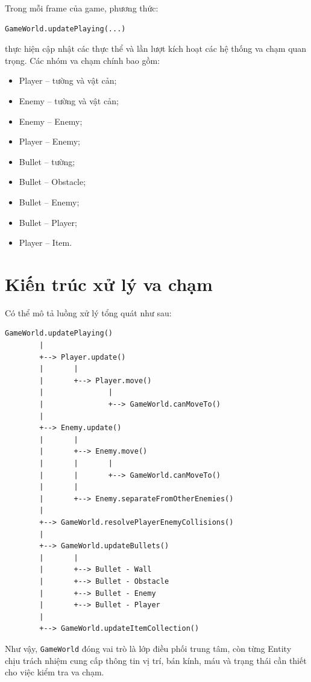 \documentclass[12pt,a4paper]{report}
\begin{document}
    Trong mỗi frame của game, phương thức:
    \begin{verbatim}
GameWorld.updatePlaying(...)
    \end{verbatim}
    thực hiện cập nhật các thực thể và lần lượt kích hoạt các hệ thống
    va chạm quan trọng.
    Các nhóm va chạm chính bao gồm:
    \begin{itemize}
        \item Player -- tường và vật cản;
        \item Enemy -- tường và vật cản;
        \item Enemy -- Enemy;
        \item Player -- Enemy;
        \item Bullet -- tường;
        \item Bullet -- Obstacle;
        \item Bullet -- Enemy;
        \item Bullet -- Player;
        \item Player -- Item.
    \end{itemize}


    \section{Kiến trúc xử lý va chạm}

    Có thể mô tả luồng xử lý tổng quát như sau:

    \begin{verbatim}
GameWorld.updatePlaying()
        |
        +--> Player.update()
        |       |
        |       +--> Player.move()
        |               |
        |               +--> GameWorld.canMoveTo()
        |
        +--> Enemy.update()
        |       |
        |       +--> Enemy.move()
        |       |       |
        |       |       +--> GameWorld.canMoveTo()
        |       |
        |       +--> Enemy.separateFromOtherEnemies()
        |
        +--> GameWorld.resolvePlayerEnemyCollisions()
        |
        +--> GameWorld.updateBullets()
        |       |
        |       +--> Bullet - Wall
        |       +--> Bullet - Obstacle
        |       +--> Bullet - Enemy
        |       +--> Bullet - Player
        |
        +--> GameWorld.updateItemCollection()
    \end{verbatim}

    Như vậy, \texttt{GameWorld} đóng vai trò là lớp điều phối trung tâm,
    còn từng Entity chịu trách nhiệm cung cấp thông tin vị trí, bán kính,
    máu và trạng thái cần thiết cho việc kiểm tra va chạm.
\end{document}
